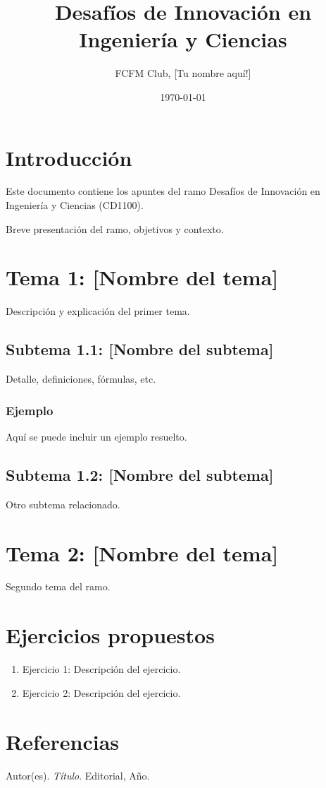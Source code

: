 \documentclass[12pt]{article}
\title{Desafíos de Innovación en Ingeniería y Ciencias}
\author{FCFM Club, [Tu nombre aquí!]}
\date{\today}
\begin{document}
\maketitle
\tableofcontents
\newpage

\section{Introducción}
Este documento contiene los apuntes del ramo Desafíos de Innovación en Ingeniería y Ciencias (CD1100).

Breve presentación del ramo, objetivos y contexto.

\section{Tema 1: [Nombre del tema]}
Descripción y explicación del primer tema.

\subsection{Subtema 1.1: [Nombre del subtema]}
Detalle, definiciones, fórmulas, etc.

\subsubsection{Ejemplo}
Aquí se puede incluir un ejemplo resuelto.

\subsection{Subtema 1.2: [Nombre del subtema]}
Otro subtema relacionado.

\section{Tema 2: [Nombre del tema]}
Segundo tema del ramo.


\section{Ejercicios propuestos}
\begin{enumerate}
    \item Ejercicio 1: Descripción del ejercicio.
    \item Ejercicio 2: Descripción del ejercicio.
\end{enumerate}

\section{Referencias}
\begin{thebibliography}{9}
     Autor(es). \textit{Título}. Editorial, Año.
\end{thebibliography}
\end{document}
